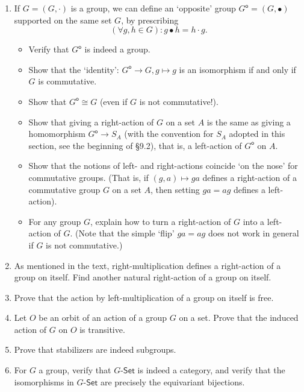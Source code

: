 \begin{enumerate}
    \item If $G = (G, \cdot)$ is a group, we can define an `opposite' group $G^\mathsf{o} = (G, \bullet)$ supported on the same set $G$, by prescribing
          \[ (\forall g, h \in G): g \bullet h = h \cdot g. \]
          \begin{itemize}
              \item Verify that $G^\mathsf{o}$ is indeed a group.
              \item Show that the `identity': $G^\mathsf{o} \to G, g \mapsto g$ is an isomorphism if and only if $G$ is commutative.
              \item Show that $G^\mathsf{o} \cong G$ (even if $G$ is not commutative!).
              \item Show that giving a right-action of $G$ on a set $A$ is the same as giving a homomorphism $G^\mathsf{o} \to S_A$ (with the convention for $S_A$ adopted in this section, see the beginning of \S9.2), that is, a left-action of $G^\mathsf{o}$ on $A$.
              \item Show that the notions of left- and right-actions coincide `on the nose' for commutative groups. (That is, if $(g, a) \mapsto ga$ defines a right-action of a commutative group $G$ on a set $A$, then setting $ga = ag$ defines a left-action).
              \item For any group $G$, explain how to turn a right-action of $G$ into a left-action of $G$. (Note that the simple `flip' $ga = ag$ does not work in general if $G$ is not commutative.)
          \end{itemize}

    \item As mentioned in the text, right-multiplication defines a right-action of a group on itself. Find another natural right-action of a group on itself.

    \item Prove that the action by left-multiplication of a group on itself is free.

    \item Let $O$ be an orbit of an action of a group $G$ on a set. Prove that the induced action of $G$ on $O$ is transitive.

    \item Prove that stabilizers are indeed subgroups.

    \item For $G$ a group, verify that $G$-$\mathsf{Set}$ is indeed a category, and verify that the isomorphisms in $G$-$\mathsf{Set}$ are precisely the equivariant bijections.


\end{enumerate}
